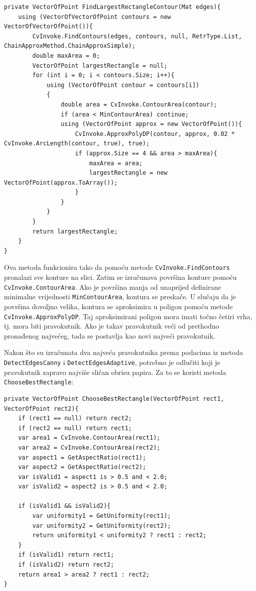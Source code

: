 \documentclass{foi}
\begin{document}
\pagebreak
\begin{lstlisting}[caption={Metoda za pronalazak najvećeg pravokutnika koji predstavlja papir}]
private VectorOfPoint FindLargestRectangleContour(Mat edges){
    using (VectorOfVectorOfPoint contours = new VectorOfVectorOfPoint()){
        CvInvoke.FindContours(edges, contours, null, RetrType.List, ChainApproxMethod.ChainApproxSimple);
        double maxArea = 0;
        VectorOfPoint largestRectangle = null;
        for (int i = 0; i < contours.Size; i++){
            using (VectorOfPoint contour = contours[i])
            {
                double area = CvInvoke.ContourArea(contour);
                if (area < MinContourArea) continue;
                using (VectorOfPoint approx = new VectorOfPoint()){
                    CvInvoke.ApproxPolyDP(contour, approx, 0.02 * CvInvoke.ArcLength(contour, true), true);
                    if (approx.Size == 4 && area > maxArea){
                        maxArea = area;
                        largestRectangle = new VectorOfPoint(approx.ToArray());
                    }
                }
            }
        }
        return largestRectangle;
    }
}
\end{lstlisting}

Ova metoda funkcionira tako da pomoću metode \texttt{CvInvoke.FindContours} pronalazi sve konture na slici. Zatim se izračunava površina konture pomoću \texttt{CvInvoke.ContourArea}. Ako je površina manja od unaprijed definirane minimalne vrijednosti \texttt{MinContourArea}, kontura se preskače. U slučaju da je površina dovoljno velika, kontura se aproksimira u poligon pomoću metode \texttt{CvInvoke.ApproxPolyDP}. Taj aproksimirani poligon mora imati točno četiri vrha, tj. mora biti pravokutnik. Ako je takav pravokutnik veći od prethodno pronađenog najvećeg, tada se postavlja kao novi najveći pravokutnik.


Nakon što su izračunata dva najveća pravokutnika prema podacima iz metoda \texttt{DetectEdgesCanny} i \texttt{DetectEdgesAdaptive}, potrebno je odlučiti koji je pravokutnik zapravo najviše sličan obrisu papira. Za to se koristi metoda \texttt{ChooseBestRectangle}:
\pagebreak
\begin{lstlisting}[caption={Metoda za odabir najboljeg pravokutnika}]
private VectorOfPoint ChooseBestRectangle(VectorOfPoint rect1, VectorOfPoint rect2){
    if (rect1 == null) return rect2;
    if (rect2 == null) return rect1;
    var area1 = CvInvoke.ContourArea(rect1);
    var area2 = CvInvoke.ContourArea(rect2);
    var aspect1 = GetAspectRatio(rect1);
    var aspect2 = GetAspectRatio(rect2);
    var isValid1 = aspect1 is > 0.5 and < 2.0;
    var isValid2 = aspect2 is > 0.5 and < 2.0;

    if (isValid1 && isValid2){
        var uniformity1 = GetUniformity(rect1);
        var uniformity2 = GetUniformity(rect2);
        return uniformity1 < uniformity2 ? rect1 : rect2;
    }
    if (isValid1) return rect1;
    if (isValid2) return rect2;
    return area1 > area2 ? rect1 : rect2;
}
\end{lstlisting}
\end{document}
